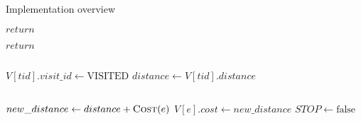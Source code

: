 \documentclass[a4paper,12pt,notitlepage,oneside]{article}
\begin{document}
\begin{section}{Implementation overview}
\begin{algorithm}
\begin{algorithmic}[1]
			\State $return$
		\EndIf

			\State $return$
		\EndIf

		\State $ $

		\State $V[tid].visit\_id\gets \text{VISITED}$
		\State $distance\gets V[tid].distance$
		
		\State $ $
		
			\State $new\_distance\gets distance + \Call{Cost}{e}$
				\State $V[e].cost\gets new\_distance$
				\State $STOP\gets \text{false}$
			\EndIf
		\EndFor
	\EndProcedure
	\end{algorithmic}
	\end{algorithm}
\end{section}
\end{document}
